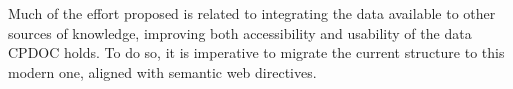 Much of the effort proposed is related to integrating the data
available to other sources of knowledge, improving both accessibility
and usability of the data CPDOC holds. To do so, it is imperative to
migrate the current structure to this modern one, aligned with
semantic web directives.









